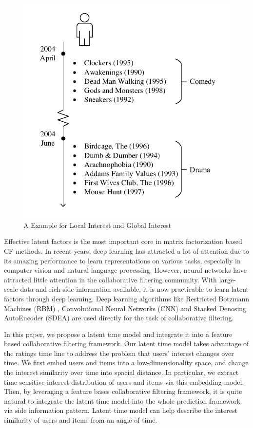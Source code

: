 \documentclass{sig-alternate-05-2015}
\begin{document}
\begin{figure}[htbp]
	\centering
	\includegraphics[scale=0.7]{images/example.pdf}
	\caption{A Example for Local Interest and Global Interest}
	\label{fig:example}
\end{figure}

Effective latent factors is the most important
core in matrix factorization based CF methods.
In recent years, deep learning \cite{hinton2006reducing, hinton2006fast}
has attracted a lot of attention due to its amazing performance
to learn representations on various tasks,
especially in computer vision and natural language processing.
However, neural networks have attracted little attention
in the collaborative filtering community.
With large-scale data and rich-side information available,
it is now practicable to learn latent factors
through deep learning.
Deep learning algorithms like Restricted Botzmann Machines (RBM)
\cite{salakhutdinov2007restricted},
Convolutional Neural Networks (CNN) \cite{wang2014improving} and
Stacked Denosing AutoEncoder (SDEA) \cite{wang2015collaborative}
are used directly for the task of collaborative filtering.

In this paper, we propose a latent time model and
integrate it into a feature based collaborative filtering framework.
Our latent time model takes advantage of the ratings time line
to address the problem that users' interest changes over time.
We first embed users and items into a low-dimensionality space,
and change the interest similarity over time into spacial distance.
In particular, we extract time sensitive interest distribution
of users and items via this embedding model.
Then, by leveraging a feature bases collaborative filtering framework,
it is quite natural to integrate the latent time model
into the whole prediction framework via side information pattern.
Latent time model can help describe the interest similarity of
users and items from an angle of time.
\end{document}
